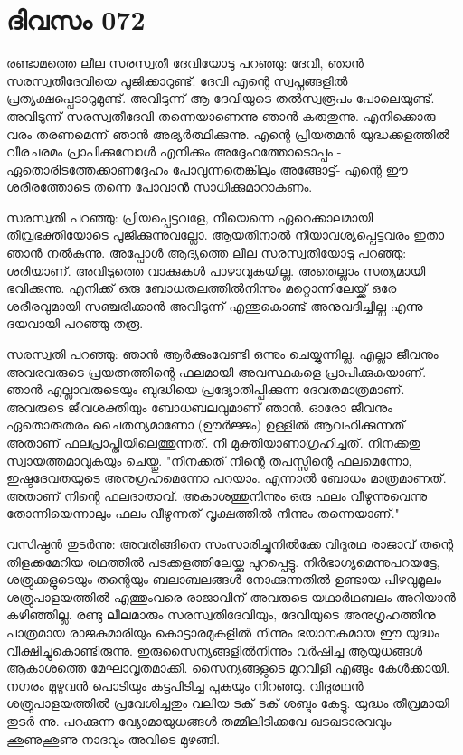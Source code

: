 \newpage
\section{ദിവസം 072}


രണ്ടാമത്തെ ലീല സരസ്വതീ ദേവിയോടു പറഞ്ഞു: ദേവീ, ഞാന്‍ സരസ്വതീദേവിയെ പൂജിക്കാറുണ്ട്‌. ദേവി എന്റെ സ്വപ്നങ്ങളില്‍ പ്രത്യക്ഷപ്പെടാറുമുണ്ട്‌. അവിടുന്ന് ആ ദേവിയുടെ തല്‍സ്വരൂപം പോലെയുണ്ട്‌. അവിടുന്ന് സരസ്വതീദേവി തന്നെയാണെന്നു ഞാന്‍ കരുതുന്നു. എനിക്കൊരു വരം തരണമെന്ന് ഞാന്‍ അഭ്യര്‍ത്ഥിക്കുന്നു. എന്റെ പ്രിയതമന്‍ യുദ്ധക്കളത്തില്‍ വീരചരമം പ്രാപിക്കുമ്പോള്‍ എനിക്കും അദ്ദേഹത്തോടൊപ്പം - ഏതൊരിടത്തേക്കാണദ്ദേഹം പോവുന്നതെങ്കിലും അങ്ങോട്ട്‌- എന്റെ ഈ ശരീരത്തോടെ തന്നെ പോവാന്‍ സാധിക്കുമാറാകണം.

സരസ്വതി പറഞ്ഞു: പ്രിയപ്പെട്ടവളേ, നീയെന്നെ ഏറെക്കാലമായി തീവ്രഭക്തിയോടെ പൂജിക്കുന്നുവല്ലോ. ആയതിനാല്‍ നീയാവശ്യപ്പെട്ടവരം ഇതാ ഞാന്‍ നല്‍കുന്നു. അപ്പോള്‍ ആദ്യത്തെ ലീല സരസ്വതിയോടു പറഞ്ഞു: ശരിയാണ്‌. അവിടുത്തെ വാക്കുകള്‍ പാഴാവുകയില്ല. അതെല്ലാം സത്യമായി ഭവിക്കുന്നു. എനിക്ക്‌ ഒരു ബോധതലത്തില്‍നിന്നും മറ്റൊന്നിലേയ്ക്ക്‌ ഒരേ ശരീരവുമായി സഞ്ചരിക്കാന്‍ അവിടുന്ന് എന്തുകൊണ്ട്‌ അനുവദിച്ചില്ല എന്നു ദയവായി പറഞ്ഞു തരൂ.

സരസ്വതി പറഞ്ഞു: ഞാന്‍ ആര്‍ക്കുംവേണ്ടി ഒന്നും ചെയ്യുന്നില്ല. എല്ലാ ജീവനും അവരവരുടെ പ്രയത്നത്തിന്റെ ഫലമായി അവസ്ഥകളെ പ്രാപിക്കുകയാണ്‌. ഞാന്‍ എല്ലാവരുടെയും ബുദ്ധിയെ പ്രദ്യോതിപ്പിക്കുന്ന ദേവതമാത്രമാണ്‌. അവരുടെ ജീവശക്തിയും ബോധബലവുമാണ്‌ ഞാന്‍. ഓരോ ജീവനും ഏതൊരുതരം ചൈതന്യമാണോ (ഊര്‍ജ്ജം) ഉള്ളില്‍ ആവഹിക്കുന്നത്‌ അതാണ്‌ ഫലപ്രാപ്തിയിലെത്തുന്നത്‌. നീ മുക്തിയാണാഗ്രഹിച്ചത്‌. നിനക്കതു സ്വായത്തമാവുകയും ചെയ്തു. "നിനക്കത്‌ നിന്റെ തപസ്സിന്റെ ഫലമെന്നോ, ഇഷ്ടദേവതയുടെ അനുഗ്രഹമെന്നോ പറയാം. എന്നാല്‍ ബോധം മാത്രമാണത്‌. അതാണ്‌ നിന്റെ ഫലദാതാവ്‌. അകാശത്തുനിന്നും ഒരു ഫലം വീഴുന്നുവെന്നു തോന്നിയെന്നാലും ഫലം വീഴുന്നത്‌ വൃക്ഷത്തില്‍ നിന്നും തന്നെയാണ്‌."

വസിഷ്ഠന്‍ തുടര്‍ന്നു: അവരിങ്ങിനെ സംസാരിച്ചുനില്‍ക്കേ വിദുരഥ രാജാവ്‌ തന്റെ തിളക്കമേറിയ രഥത്തില്‍ പടക്കളത്തിലേയ്ക്കു പുറപ്പെട്ടു. നിര്‍ഭാഗ്യമെന്നുപറയട്ടേ, ശത്രുക്കളുടെയും തന്റെയും ബലാബലങ്ങള്‍ നോക്കുന്നതില്‍ ഉണ്ടായ പിഴവുമൂലം ശത്രുപാളയത്തില്‍ എത്തുംവരെ രാജാവിന്‌ അവരുടെ യഥാര്‍ഥബലം അറിയാന്‍ കഴിഞ്ഞില്ല. രണ്ടു ലീലമാരും സരസ്വതിദേവിയും, ദേവിയുടെ അനുഗൃഹത്തിനു പാത്രമായ രാജകുമാരിയും കൊട്ടാരമുകളില്‍ നിന്നും ഭയാനകമായ ഈ യുദ്ധം വീക്ഷിച്ചുകൊണ്ടിരുന്നു. ഇരുസൈന്യങ്ങളില്‍നിന്നും വര്‍ഷിച്ച ആയുധങ്ങള്‍ ആകാശത്തെ മേഘാവൃതമാക്കി. സൈന്യങ്ങളുടെ മുറവിളി എങ്ങും കേള്‍ക്കായി. നഗരം മുഴുവന്‍ പൊടിയും കട്ടപിടിച്ച പുകയും നിറഞ്ഞു. വിദുരഥന്‍ ശത്രുപാളയത്തില്‍ പ്രവേശിച്ചതും വലിയ ടക്‌ ടക്‌ ശബ്ദം കേട്ടു. യുദ്ധം തീവ്രമായി തുടര്‍ ന്നു. പറക്കുന്ന വ്യോമായുധങ്ങള്‍ തമ്മിലിടിക്കവേ ഖടഖടാരവവും ഛുണുഛുണു നാദവും അവിടെ മുഴങ്ങി.
